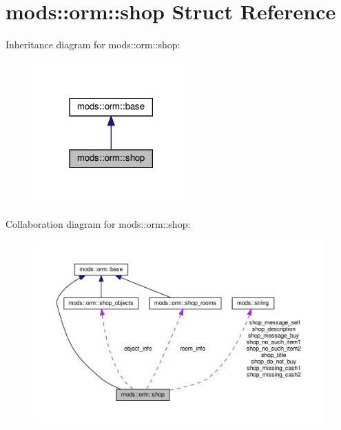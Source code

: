 \hypertarget{structmods_1_1orm_1_1shop}{}\section{mods\+:\+:orm\+:\+:shop Struct Reference}
\label{structmods_1_1orm_1_1shop}


Inheritance diagram for mods\+:\+:orm\+:\+:shop\+:\nopagebreak
\begin{figure}[H]
\begin{center}
\leavevmode
\includegraphics[width=170pt]{structmods_1_1orm_1_1shop__inherit__graph}
\end{center}
\end{figure}


Collaboration diagram for mods\+:\+:orm\+:\+:shop\+:\nopagebreak
\begin{figure}[H]
\begin{center}
\leavevmode
\includegraphics[width=350pt]{structmods_1_1orm_1_1shop__coll__graph}
\end{center}
\end{figure}
